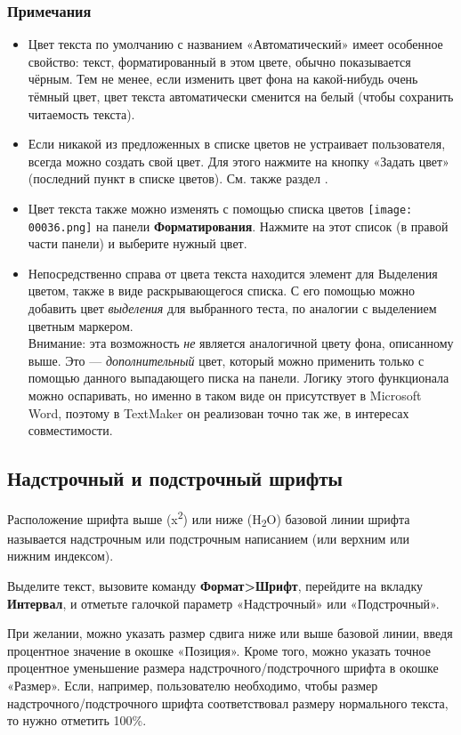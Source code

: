 ﻿\documentclass[a4paper,10pt]{article}
\begin{document}
\subsubsection{Примечания}
\begin{itemize}
 \item Цвет текста по умолчанию с названием «Автоматический» имеет особенное свойство: текст, форматированный в этом цвете, обычно показывается чёрным. Тем не менее, если изменить цвет фона на какой-нибудь очень тёмный цвет, цвет текста автоматически сменится на белый (чтобы сохранить читаемость текста).
 \item Если никакой из предложенных в списке цветов не устраивает пользователя, всегда можно создать свой цвет. Для этого нажмите на кнопку «Задать цвет» (последний пункт в списке цветов). См. также раздел .
 \item Цвет текста также можно изменять с помощью списка цветов \texttt{[image: 00036.png]} на панели \textbf{Форматирования}. Нажмите на этот список (в правой части панели) и выберите нужный цвет.
 \item Непосредственно справа от цвета текста находится элемент для Выделения цветом, также в виде раскрывающегося списка. С его помощью можно добавить цвет \textit{выделения} для выбранного теста, по аналогии с выделением цветным маркером.\\
 Внимание: эта возможность \textit{не} является аналогичной цвету фона, описанному выше. Это — \textit{дополнительный} цвет, который можно применить только с помощью данного выпадающего писка на панели. Логику этого функционала можно оспаривать, но именно в таком виде он присутствует в Microsoft Word, поэтому в TextMaker он реализован точно так же, в интересах совместимости.
\end{itemize}

\subsection{Надстрочный и подстрочный шрифты} \label{sec:надстриподстршрифты}
Расположение шрифта выше (x\textsuperscript{2}) или ниже (H\textsubscript{2}O) базовой линии шрифта называется надстрочным или подстрочным написанием (или верхним или нижним индексом).

Выделите текст, вызовите команду \textbf{Формат>Шрифт}, перейдите на вкладку \textbf{Интервал}, и отметьте галочкой параметр «Надстрочный» или «Подстрочный».

При желании, можно указать размер сдвига ниже или выше базовой линии, введя процентное значение в окошке «Позиция». Кроме того, можно указать точное процентное уменьшение размера надстрочного/подстрочного шрифта в окошке «Размер». Если, например, пользователю необходимо, чтобы размер  надстрочного/подстрочного шрифта соответствовал размеру нормального текста, то нужно отметить 100\%.
\end{document}

